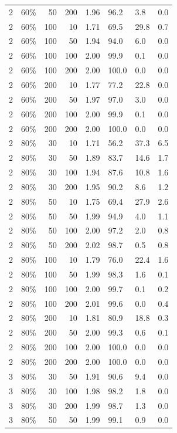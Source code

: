 \begin{table}[ht]
\begin{tabular}{rlrrllll}
  2 & 60\% & 50 & 200 & 1.96 & 96.2 & 3.8 & 0.0 \\ 
  2 & 60\% & 100 & 10 & 1.71 & 69.5 & 29.8 & 0.7 \\ 
  2 & 60\% & 100 & 50 & 1.94 & 94.0 & 6.0 & 0.0 \\ 
  2 & 60\% & 100 & 100 & 2.00 & 99.9 & 0.1 & 0.0 \\ 
  2 & 60\% & 100 & 200 & 2.00 & 100.0 & 0.0 & 0.0 \\ 
  2 & 60\% & 200 & 10 & 1.77 & 77.2 & 22.8 & 0.0 \\ 
  2 & 60\% & 200 & 50 & 1.97 & 97.0 & 3.0 & 0.0 \\ 
  2 & 60\% & 200 & 100 & 2.00 & 99.9 & 0.1 & 0.0 \\ 
  2 & 60\% & 200 & 200 & 2.00 & 100.0 & 0.0 & 0.0 \\ 
  2 & 80\% & 30 & 10 & 1.71 & 56.2 & 37.3 & 6.5 \\ 
  2 & 80\% & 30 & 50 & 1.89 & 83.7 & 14.6 & 1.7 \\ 
  2 & 80\% & 30 & 100 & 1.94 & 87.6 & 10.8 & 1.6 \\ 
  2 & 80\% & 30 & 200 & 1.95 & 90.2 & 8.6 & 1.2 \\ 
  2 & 80\% & 50 & 10 & 1.75 & 69.4 & 27.9 & 2.6 \\ 
  2 & 80\% & 50 & 50 & 1.99 & 94.9 & 4.0 & 1.1 \\ 
  2 & 80\% & 50 & 100 & 2.00 & 97.2 & 2.0 & 0.8 \\ 
  2 & 80\% & 50 & 200 & 2.02 & 98.7 & 0.5 & 0.8 \\ 
  2 & 80\% & 100 & 10 & 1.79 & 76.0 & 22.4 & 1.6 \\ 
  2 & 80\% & 100 & 50 & 1.99 & 98.3 & 1.6 & 0.1 \\ 
  2 & 80\% & 100 & 100 & 2.00 & 99.7 & 0.1 & 0.2 \\ 
  2 & 80\% & 100 & 200 & 2.01 & 99.6 & 0.0 & 0.4 \\ 
  2 & 80\% & 200 & 10 & 1.81 & 80.9 & 18.8 & 0.3 \\ 
  2 & 80\% & 200 & 50 & 2.00 & 99.3 & 0.6 & 0.1 \\ 
  2 & 80\% & 200 & 100 & 2.00 & 100.0 & 0.0 & 0.0 \\ 
  2 & 80\% & 200 & 200 & 2.00 & 100.0 & 0.0 & 0.0 \\ 
  3 & 80\% & 30 & 50 & 1.91 & 90.6 & 9.4 & 0.0 \\ 
  3 & 80\% & 30 & 100 & 1.98 & 98.2 & 1.8 & 0.0 \\ 
  3 & 80\% & 30 & 200 & 1.99 & 98.7 & 1.3 & 0.0 \\ 
  3 & 80\% & 50 & 50 & 1.99 & 99.1 & 0.9 & 0.0 \\ 

\end{tabular}
\end{table}
